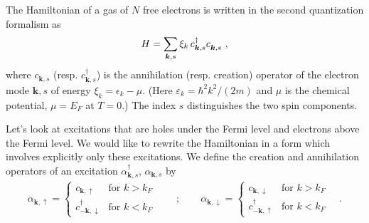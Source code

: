 \documentclass[11pt,a4paper]{article}
\newcommand{\boldk}{{\boldsymbol k}}
\newcommand{\nodagger}{{\vphantom{\dagger}}} %
\begin{document}
%
%
\MakeUebungHeader





The Hamiltonian of a gas of $N$ free electrons is written in the second quantization formalism as
\begin{align}
  \label{eq:HamiltonianFreeElectronGas}
  H = \sum_{\boldk,s} \xi_k\, c_{\boldk,s}^\dagger c^\nodagger_{\boldk,s}\ ,
\end{align}
where $c_{\boldk,s}$ (resp. $c_{\boldk,s}^\dagger$) is the annihilation (resp. creation) operator of the
electron mode $\boldk,s$ of energy $\xi_k = \epsilon_k - \mu$. (Here $\varepsilon_k=\hbar^2 k^2/(2m)$ and
$\mu$ is the chemical potential, $\mu=E_F$ at $T=0$.) The index $s$ distinguishes the two spin components.

Let's look at excitations that are holes under the Fermi level and electrons above the Fermi level. We
would like to rewrite the Hamiltonian in a form which involves explicitly only these excitations.
We define the creation and annihilation operators of an excitation $\alpha^\dagger_{\boldk,s}$,
$\alpha_{\boldk,s}$ by
\begin{align}
  \label{eq:Alphas}
  \alpha_{\boldk,\uparrow} =
  \begin{cases} c_{\boldk,\uparrow} & \text{for $k>k_F$} \\
    c_{-\boldk,\downarrow}^\dagger & \text{for $k<k_F$} \end{cases}
  \qquad ; \qquad
  \alpha_{\boldk,\downarrow} =
  \begin{cases} c_{\boldk,\downarrow} & \text{for $k>k_F$} \\
    c_{-\boldk,\uparrow}^\dagger & \text{for $k<k_F$} \end{cases}
  \quad .
\end{align}
\end{document}
